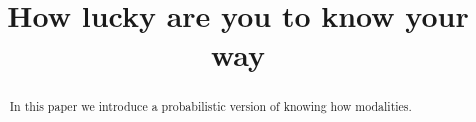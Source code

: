 \documentclass{article}
\begin{document}
\title{How lucky are you to know your way}
\author{}
\date{}


\maketitle

\begin{abstract}
    In this paper we introduce a probabilistic version of knowing how modalities.
\end{abstract}

% 






\end{document}
